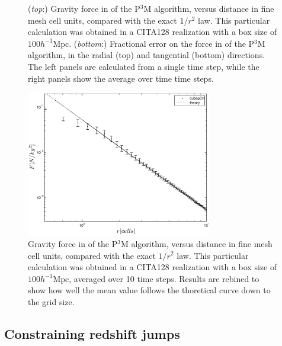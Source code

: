 \begin{figure}
\begin{center}
  \caption{({\it top}:) Gravity force in of the P$^3$M algorithm, versus distance in fine mesh cell units, compared with the exact $1/r^{2}$ law.
    This particular calculation was obtained in a CITA128 realization with  a box size of $100 h^{-1}\mbox{Mpc}$.
    ({\it bottom}:) Fractional error on the force in of the P$^3$M algorithm, in the radial (top) and tangential (bottom) directions.
    The left panels are calculated from a single time step, while the right panels show the average over time time steps.
    \label{fig:den_force_N10}}
\end{center}
\end{figure}

\begin{figure}%
  \begin{center}
     \includegraphics[width=3.2in]{graphs/densityForce_ppext=10_rebin.eps}
  \caption{ Gravity force in of the P$^3$M algorithm, versus distance in fine mesh cell units, compared with the exact $1/r^{2}$ law.
    This particular calculation was obtained in a CITA128 realization with  a box size of $100 h^{-1}\mbox{Mpc}$, averaged over 10 time steps.
    Results are rebined to show how well the mean value follows the thoretical curve down to the grid size.
    \label{fig:F_rebin}}
\end{center}
\end{figure}

\subsection{Constraining redshift jumps}

